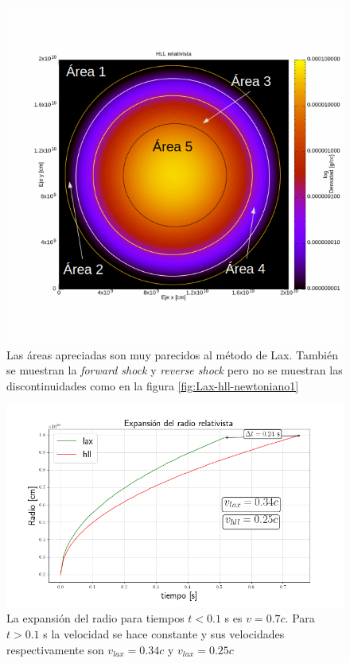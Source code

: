 \documentclass[12pt,a4paper]{book}
\begin{document}
\begin{figure}
\centering
\includegraphics[scale=0.5]{./Figuras/Pruebas/Prueba_onda_choque/Lax-HLL-rel/bwhll-rel65-analisis}
\caption{\label{fig:analisis_onda_relativista_hll1}Las áreas apreciadas son muy parecidos al método de Lax. También se muestran la \emph{forward shock} y \emph{reverse shock} pero no se muestran las discontinuidades como en la figura \ref{fig:Lax-hll-newtoniano1}}
\end{figure}


\begin{figure}
\centering
\includegraphics[scale=0.5]{./Figuras/Pruebas/expansion_radial/Expansion_radio_relativista}
\caption{\label{fig:expansion_radio_relativista} La expansión del radio para tiempos $t < 0.1$ s es $v = 0.7c$. Para $t>0.1$ s la velocidad se hace constante y sus velocidades respectivamente son $v_{lax} = 0.34c$ y $v_{lax} = 0.25c$}
\end{figure}
\end{document}

